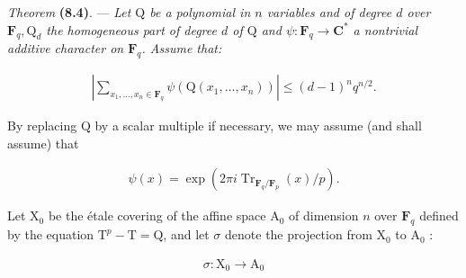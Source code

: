 \documentclass[10pt,leqno]{article}
\begin{document}
\noindent \emph{Theorem} \textbf{(8.4)}. — {\itshape Let \(\mathrm{Q}\) be a polynomial in \(n\) variables and of degree \(d\) over \(\mathbf{F}_{q}, \mathrm{Q}_{d}\) the homogeneous part of degree \(d\) of \(\mathrm{Q}\) and \(\psi  : \mathbf{F}_{q} \longrightarrow  \mathbf{C}^{*}\) a nontrivial additive character on \(\mathbf{F}_{q}\). Assume that:}\par

\par

\clearpage

\label{physical-32}

\par

\begin{equation*}\begin{gathered}|\sum _{x_{1},\ldots ,x_{n} \in  \mathbf{F}_{q}} \psi (\mathrm{Q}(x_{1},\ldots ,x_{n}))| \leq  (d-1)^{n} q^{n/2}.\end{gathered}\end{equation*}

\noindent By replacing \(\mathrm{Q}\) by a scalar multiple if necessary, we may assume (and shall assume) that\par

\begin{equation*}\begin{gathered}\psi (x) = \operatorname{exp}(2\pi i \operatorname{Tr}_{\mathbf{F}_{q}/\mathbf{F}_{p}}(x)/p).\end{gathered}\tag{8.4.1}\end{equation*}

\noindent Let \(\mathrm{X}_{0}\) be the étale covering of the affine space \(\mathrm{A}_{0}\) of dimension \(n\) over \(\mathbf{F}_{q}\) defined by the equation \(\mathrm{T}^{p} - \mathrm{T} = \mathrm{Q}\), and let \(\sigma \) denote the projection from \(\mathrm{X}_{0}\) to \(\mathrm{A}_{0}\) :\par

\begin{equation*}\begin{gathered}\sigma  : \mathrm{X}_{0} \longrightarrow  \mathrm{A}_{0}\end{gathered}\end{equation*}
\end{document}
